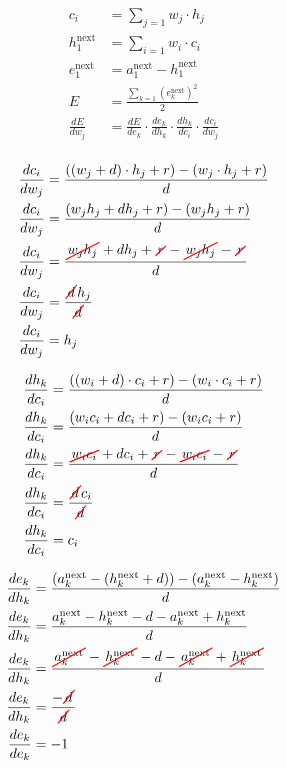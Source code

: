 \documentclass{article}
\newcommand{\cancel}[2][0.8pt]{%
	\tikz[baseline=(X.base)]{
		\node[inner sep=1pt] (X) {$#2$};
		\draw[line width=#1, red, line cap=round] (X.south west) -- (X.north east);
	}%
}
\begin{document}
\begin{align*}
	c_i&=\sum_{j=1}w_j\cdot h_j\\
	h_1^{\text{next}}&=\sum_{i=1}w_i\cdot c_i\\
	e_1^{\text{next}}&=a_1^\text{next}-h_1^\text{next}\\
	E&=\frac{\sum_{k=1}(e_k^{\text{next}})^2}{2}\\
	\frac{dE}{dw_j}&=\frac{dE}{de_k}\cdot \frac{de_k}{dh_k} \cdot \frac{dh_k}{dc_i} \cdot \frac{dc_i}{dw_j}\\
\end{align*}

\begin{align*}
	\frac{dc_i}{dw_j}&=\frac{((w_j+d)\cdot h_j+r)-(w_j\cdot h_j+r)}{d}\\
	\frac{dc_i}{dw_j}&=\frac{(w_jh_j+dh_j+r)-(w_jh_j+r)}{d}\\
	\frac{dc_i}{dw_j}&=\frac{\cancel{w_jh_j}+dh_j+\cancel{r}-\cancel{w_jh_j}-\cancel{r}}{d}\\
	\frac{dc_i}{dw_j}&=\frac{\cancel{d}h_j}{\cancel{d}}\\
	\frac{dc_i}{dw_j}&=h_j\\
\end{align*}

\begin{align*}
	\frac{dh_k}{dc_i}&=\frac{((w_i+d)\cdot c_i+r)-(w_i\cdot c_i+r)}{d}\\
	\frac{dh_k}{dc_i}&=\frac{(w_ic_i+dc_i+r)-(w_ic_i+r)}{d}\\
	\frac{dh_k}{dc_i}&=\frac{\cancel{w_ic_i}+dc_i+\cancel{r}-\cancel{w_ic_i}-\cancel{r}}{d}\\
	\frac{dh_k}{dc_i}&=\frac{\cancel{d}c_i}{\cancel{d}}\\
	\frac{dh_k}{dc_i}&=c_i\\
\end{align*}

\begin{align*}
	\frac{de_k}{dh_k}&=\frac{(a_k^\text{next}- (h_k^\text{next}+d))-(a_k^\text{next}- h_k^\text{next})}{d}\\
	\frac{de_k}{dh_k}&=\frac{a_k^\text{next}- h_k^\text{next}-d-a_k^\text{next}+ h_k^\text{next}}{d}\\
	\frac{de_k}{dh_k}&=\frac{\cancel{a_k^\text{next}}- \cancel{h_k^\text{next}}-d-\cancel{a_k^\text{next}}+ \cancel{h_k^\text{next}}}{d}\\
	\frac{de_k}{dh_k}&=\frac{-\cancel{d}}{\cancel{d}}\\
	\frac{de_k}{de_k}&=-1
\end{align*}
\end{document}
